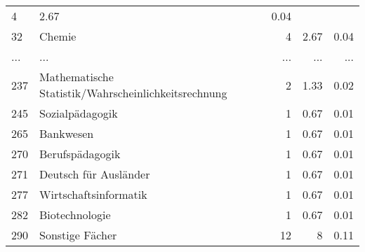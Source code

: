 \begin{longtable}{lXrrr}
          \num{4} &
          \num[round-mode=places,round-precision=2]{2,67} &
          \num[round-mode=places,round-precision=2]{0,04} \\
        32 & \multicolumn{1}{X}{Chemie} & %
          \num{4} &
          \num[round-mode=places,round-precision=2]{2,67} &
          \num[round-mode=places,round-precision=2]{0,04} \\
       ... & ... & ... & ... & ... \\
        237 & \multicolumn{1}{X}{Mathematische Statistik/Wahrscheinlichkeitsrechnung} & %
          \num{2} &
          \num[round-mode=places,round-precision=2]{1,33} &
          \num[round-mode=places,round-precision=2]{0,02} \\

        245 & \multicolumn{1}{X}{Sozialpädagogik} & %
          \num{1} &
          \num[round-mode=places,round-precision=2]{0,67} &
          \num[round-mode=places,round-precision=2]{0,01} \\

        265 & \multicolumn{1}{X}{Bankwesen} & %
          \num{1} &
          \num[round-mode=places,round-precision=2]{0,67} &
          \num[round-mode=places,round-precision=2]{0,01} \\

        270 & \multicolumn{1}{X}{Berufspädagogik} & %
          \num{1} &
          \num[round-mode=places,round-precision=2]{0,67} &
          \num[round-mode=places,round-precision=2]{0,01} \\

        271 & \multicolumn{1}{X}{Deutsch für Ausländer} & %
          \num{1} &
          \num[round-mode=places,round-precision=2]{0,67} &
          \num[round-mode=places,round-precision=2]{0,01} \\

        277 & \multicolumn{1}{X}{Wirtschaftsinformatik} & %
          \num{1} &
          \num[round-mode=places,round-precision=2]{0,67} &
          \num[round-mode=places,round-precision=2]{0,01} \\

        282 & \multicolumn{1}{X}{Biotechnologie} & %
          \num{1} &
          \num[round-mode=places,round-precision=2]{0,67} &
          \num[round-mode=places,round-precision=2]{0,01} \\

        290 & \multicolumn{1}{X}{Sonstige Fächer} & %
          \num{12} &
          \num[round-mode=places,round-precision=2]{8} &
          \num[round-mode=places,round-precision=2]{0,11} \\


\end{longtable}
